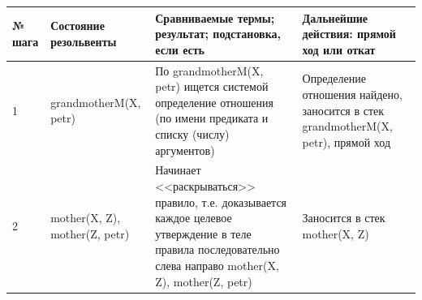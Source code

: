 \documentclass[a4paper,14pt]{extreport} %
\begin{document}
\begin{longtable}{|p{0.5cm}|p{4cm}|p{7cm}|p{5.5cm}|}
	\hline
 	№ шага & Состояние резольвенты & Сравниваемые термы; результат; подстановка, если есть  & Дальнейшие действия: прямой ход или откат \\ \hline
	1 & grandmotherM(X, petr) & По grandmotherM(X, petr) ищется системой определение отношения (по имени предиката и списку (числу) аргументов) & Определение отношения найдено, заносится в стек grandmotherM(X, petr), прямой ход \\ \hline
	2 &mother(X, Z), mother(Z, petr)& Начинает <<раскрываться>> правило, т.е. доказывается каждое целевое утверждение в теле правила последовательно слева направо
	mother(X, Z), mother(Z, petr)
	
	& Заносится в стек mother(X, Z)\\ \hline


\end{longtable}
\end{document}
